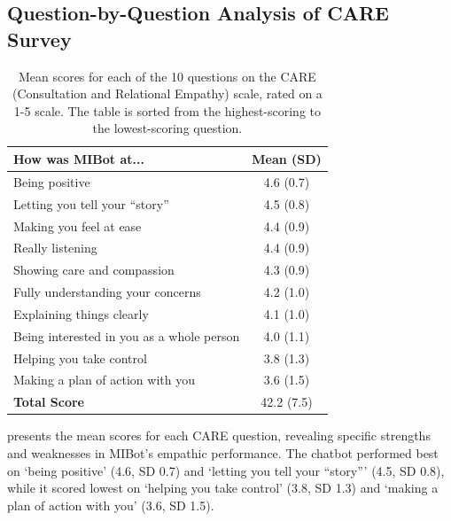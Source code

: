 \subsection*{Question-by-Question Analysis of CARE Survey}
\begin{table}[ht]
	\centering
	\small
	\setlength{\tabcolsep}{3pt}
	\renewcommand{\arraystretch}{1.1}
	\begin{tabular}{@{}lc@{}}
		\toprule
		\textbf{How was MIBot at...}              & \textbf{Mean (SD)} \\
		\midrule
		Being positive                            & 4.6 (0.7)          \\
		Letting you tell your ``story''           & 4.5 (0.8)          \\
		Making you feel at ease                   & 4.4 (0.9)          \\
		Really listening                          & 4.4 (0.9)          \\
		Showing care and compassion               & 4.3 (0.9)          \\
		Fully understanding your concerns         & 4.2 (1.0)          \\
		Explaining things clearly                 & 4.1 (1.0)          \\
		Being interested in you as a whole person & 4.0 (1.1)          \\
		Helping you take control                  & 3.8 (1.3)          \\
		Making a plan of action with you          & 3.6 (1.5)          \\
		\midrule
		\textbf{Total Score}                      & 42.2 (7.5)         \\
		\bottomrule
	\end{tabular}
	\caption[Mean CARE Scores per Question]{Mean scores for each of the 10 questions on the CARE (Consultation and Relational Empathy) scale, rated on a 1-5 scale. The table is sorted from the highest-scoring to the lowest-scoring question.}
	\label{table:care_question_means}
\end{table}
 presents the mean scores for each CARE question, revealing specific strengths and weaknesses in MIBot's empathic performance. The chatbot performed best on `being positive' (4.6, SD 0.7) and `letting you tell your ``story''' (4.5, SD 0.8), while it scored lowest on `helping you take control' (3.8, SD 1.3) and `making a plan of action with you' (3.6, SD 1.5).


